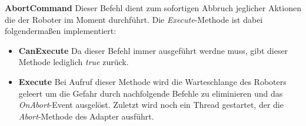 \textbf{AbortCommand}
\newline
Dieser Befehl dient zum sofortigen Abbruch jeglicher Aktionen die der Roboter im Moment durchführt. Die \textit{Execute}-Methode ist dabei folgendermaßen implementiert:
\begin{itemize}
\item \textbf{CanExecute}
\newline
Da dieser Befehl immer ausgeführt werdne muss, gibt dieser Methode lediglich \textit{true} zurück.
\item \textbf{Execute}
\newline
Bei Aufruf dieser Methode wird die Warteschlange des Roboters geleert um die Gefahr durch nachfolgende Befehle zu eliminieren und das \textit{OnAbort}-Event ausgelöst. Zuletzt wird noch ein Thread gestartet, der die \textit{Abort}-Methode des Adapter ausführt. 
\end{itemize}